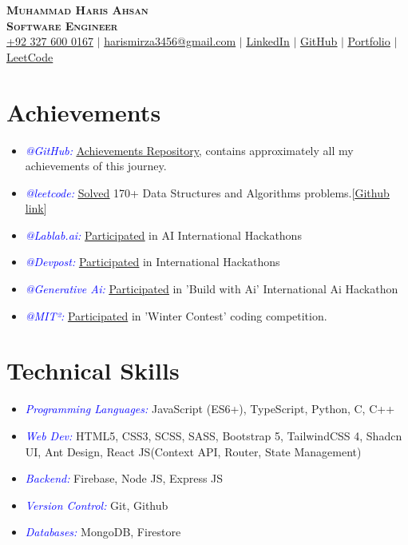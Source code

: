 \documentclass[letterpaper,11pt]{article}
\newcommand{\resumeItem}[1]{
  \item\small{
    {#1 \vspace{-2pt}}
  }
}
\newcommand{\resumeItemListStart}{\begin{itemize}}
\newcommand{\resumeItemListEnd}{\end{itemize}\vspace{-5pt}}
\begin{document}
\begin{center}
  \textbf{\Huge \scshape Muhammad Haris Ahsan} \\ \vspace{1pt}
  \textbf{\small \scshape Software Engineer} \\ \vspace{5pt}
  \href{https://wa.me/+923276000167}{+92 327 600 0167}  $|$
  \href{mailto:harismirza3456@gmail.com}{harismirza3456@gmail.com}  $|$
  \href{https://www.linkedin.com/in/iamharisahsan/}{\underline{LinkedIn}} $|$
  \href{https://github.com/Haris-Mughal}{\underline{GitHub}} $|$
  \href{https://muhammad-haris-ahsan.vercel.app/}{\underline{Portfolio}} $|$
  \href{https://leetcode.com/u/Muhammad_Haris_Ahsan/}{\underline{LeetCode}}
\end{center}

\section{\textbf{Achievements}}
\resumeItemListStart
\resumeItem{\textcolor{blue}{\itshape @GitHub:} {\href{https://github.com/Haris-Mughal/achievements/}{\underline{Achievements Repository}}}, contains approximately all my achievements of this journey.}
\resumeItem{\textcolor{blue}{\itshape @leetcode:} {\href{https://leetcode.com/u/Muhammad_Haris_Ahsan/}{\underline{Solved}}} 170+ Data Structures and Algorithms problems.[{\href{https://github.com/Haris-Mughal/leetcode-Solutions.py/}{\underline{Github link}}}]}
\resumeItem{\textcolor{blue}{\itshape @Lablab.ai:} {\href{https://lablab.ai/u/@muhammad_haris_ahsan569}{\underline{Participated}}} in AI International Hackathons}
\resumeItem{\textcolor{blue}{\itshape @Devpost:} {\href{https://devpost.com/iamharisahsan}{\underline{Participated}}} in International Hackathons}
\resumeItem{\textcolor{blue}{\itshape @Generative Ai:} {\href{https://community.genai.works/members/30362861}{\underline{Participated}}} in 'Build with Ai' International Ai Hackathon}
\resumeItem{\textcolor{blue}{\itshape @M{IT}²:} {\underline{Participated}} in 'Winter Contest' coding competition.}

\resumeItemListEnd

\section{\textbf{Technical Skills}}
\resumeItemListStart
\resumeItem{\textcolor{blue}{\itshape \textcolor{blue}{\itshape Programming Languages:}}{ JavaScript (ES6+), TypeScript, Python, C, C++} \\}
\resumeItem{\textcolor{blue}{\itshape Web Dev:}{ HTML5, CSS3, SCSS, SASS, Bootstrap 5, TailwindCSS 4, Shadcn UI, Ant Design, React JS(Context API, Router, State Management)} \\}
\resumeItem{\textcolor{blue}{\itshape Backend:}{ Firebase, Node JS, Express JS} \\}
\resumeItem{\textcolor{blue}{\itshape Version Control:}{ Git, Github} \\}
\resumeItem{\textcolor{blue}{\itshape Databases:}{ MongoDB, Firestore}\\}
\resumeItemListEnd
%
\end{document}
